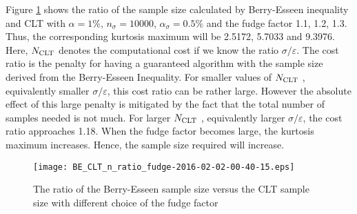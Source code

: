 \documentclass{iitthesis}
\theoremstyle{definition}
\begin{document}
Figure \ref{fig:ratioBEnCLTn} shows the ratio of the sample size calculated by Berry-Esseen inequality and CLT with $\alpha = 1\%$, $n_\sigma = 10000$, $\alpha_\sigma = 0.5\%$ and the fudge factor 1.1, 1.2, 1.3.  Thus, the corresponding kurtosis maximum will be 2.5172, 5.7033 and 9.3976.  Here, $N_{\text{CLT}}$ denotes the computational cost if we know the ratio $\sigma/\varepsilon$. The cost ratio is the penalty for having a guaranteed algorithm with the sample size derived from the Berry-Esseen Inequality. For smaller values of $N_{\text{CLT}}$ , equivalently smaller $\sigma/\varepsilon$, this cost ratio can be rather large. However the absolute effect of this large penalty is mitigated by the fact that the total number of samples needed is not much. For larger $N_{\text{CLT}}$ , equivalently larger $\sigma/\varepsilon$,  the cost ratio approaches 1.18. When the fudge factor becomes large, the kurtosis maximum increases. Hence, the sample size required will increase.

 \begin{figure}[htbp]
    \centering
    \texttt{[image: BE\_CLT\_n\_ratio\_fudge-2016-02-02-00-40-15.eps]} %
    \caption{The ratio of the Berry-Esseen sample size versus the CLT sample size with different choice of the fudge factor}
    \label{fig:ratioBEnCLTn}
 \end{figure}
%
%
%
%
%
%
%
%

\end{document}

